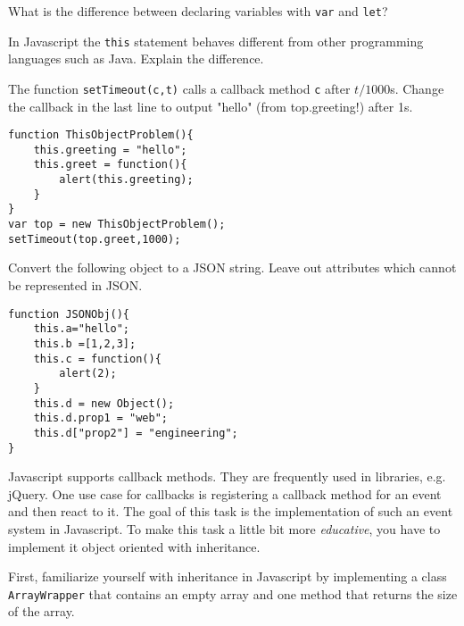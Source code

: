 \documentclass{./handout}
\begin{document}
\begin{subtask}
What is the difference between declaring variables with \texttt{var} and \texttt{let}?
\end{subtask}

\begin{subtask}
In Javascript the \texttt{this} statement  behaves different from other programming languages such as Java. Explain the difference.

The function \texttt{setTimeout(c,t)} calls a callback method \texttt{c} after $t/1000$s. Change the callback in the last line to output "hello" (from top.greeting!) after 1s.
\begin{lstlisting}
function ThisObjectProblem(){
	this.greeting = "hello";
	this.greet = function(){
		alert(this.greeting);
	}
}
var top = new ThisObjectProblem();
setTimeout(top.greet,1000);
\end{lstlisting}
\end{subtask}

\begin{subtask}
Convert the following object to a JSON string. Leave out attributes which cannot be represented in JSON.
 \begin{lstlisting}
function JSONObj(){
	this.a="hello";
	this.b =[1,2,3];
	this.c = function(){
		alert(2);
	}
	this.d = new Object();
	this.d.prop1 = "web";
	this.d["prop2"] = "engineering";
}

\end{lstlisting}
\end{subtask}

\pagebreak
{}

Javascript supports callback methods. They are frequently used in libraries, e.g. jQuery. One use case for callbacks is registering a callback method for an event and then react to it. The goal of this task is the implementation of such an event system in Javascript.
To make this task a little bit more \emph{educative}, you have to implement it object oriented with inheritance.

\begin{subtask}
First, familiarize yourself with inheritance in Javascript by implementing a class \texttt{ArrayWrapper} that contains an empty array and one method that returns the size of the array.
\end{subtask}
\end{document}
